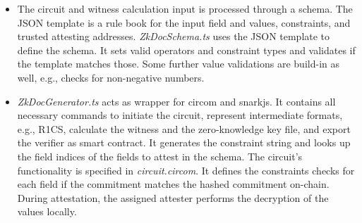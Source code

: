 \begin{itemize}

\item The circuit and witness calculation input is processed through a schema. The JSON template is a rule book for the input field and values, constraints, and trusted attesting addresses. \textit{ZkDocSchema.ts} uses the JSON template to define the schema. It sets valid operators and constraint types and validates if the template matches those. Some further value validations are build-in as well, e.g., checks for non-negative numbers. 

\item \textit{ZkDocGenerator.ts} acts as wrapper for circom and snarkjs. It contains all necessary commands to initiate the circuit, represent intermediate formats, e.g., R1CS, calculate the witness and the zero-knowledge key file, and export the verifier as smart contract. It generates the constraint string and looks up the field indices of the fields to attest in the schema. The circuit's functionality is specified in \textit{circuit.circom}. It defines the constraints checks for each field if the commitment matches the hashed commitment on-chain. During attestation, the assigned attester performs the decryption of the values locally.


\end{itemize}

